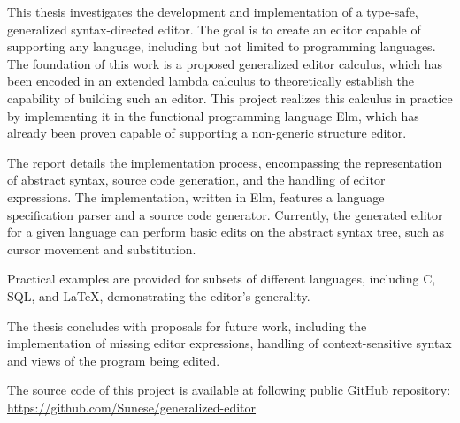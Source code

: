 This thesis investigates the development and implementation of a type-safe, generalized syntax-directed editor. The goal is to create an editor capable of supporting any language, including but not limited to programming languages. The foundation of this work is a proposed generalized editor calculus, which has been encoded in an extended lambda calculus to theoretically establish the capability of building such an editor. This project realizes this calculus in practice by implementing it in the functional programming language Elm, which has already
been proven capable of supporting a non-generic structure editor.

The report details the implementation process, encompassing the representation of abstract syntax, source code generation, and the handling of editor expressions. The implementation, written in Elm, features a language specification parser and a source code generator. Currently, the generated editor for a given language can perform basic edits on the abstract syntax tree, such as cursor movement and substitution.

Practical examples are provided for subsets of different languages, including C, SQL, and \LaTeX, demonstrating the editor's generality.

The thesis concludes with proposals for future work, including the implementation of missing editor expressions, handling of context-sensitive syntax and views of the program being edited.


The source code of this project is available at following public GitHub repository: \url{https://github.com/Sunese/generalized-editor}
